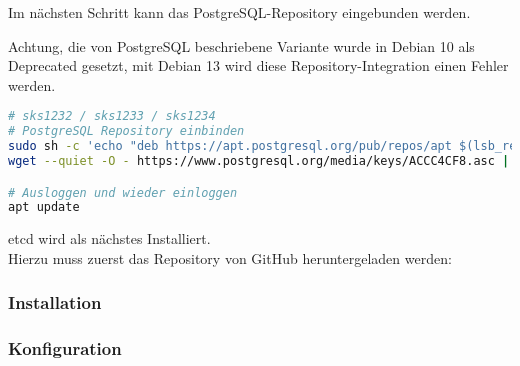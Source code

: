 \begin{flushleft}
    Im nächsten Schritt kann das PostgreSQL-Repository eingebunden werden.\\
    \begin{warning}
    Achtung, die von PostgreSQL beschriebene Variante wurde in Debian 10 als Deprecated gesetzt,
    mit Debian 13 wird diese Repository-Integration einen Fehler werden.
    \end{warning}    \lstset{style=gra_codestyle}
\begin{lstlisting}[language=bash, caption=Patroni - PostgreSQL einbinden,captionpos=b,label={lst:patroni-include-repository},breaklines=true]
# sks1232 / sks1233 / sks1234
# PostgreSQL Repository einbinden
sudo sh -c 'echo "deb https://apt.postgresql.org/pub/repos/apt $(lsb_release -cs)-pgdg main" > /etc/apt/sources.list.d/pgdg.list'
wget --quiet -O - https://www.postgresql.org/media/keys/ACCC4CF8.asc | sudo apt-key add -

# Ausloggen und wieder einloggen
apt update
\end{lstlisting}
\end{flushleft}
\begin{flushleft}
    \gls{etcd} wird als nächstes Installiert.\\
    Hierzu muss zuerst das Repository von \Gls{GitHub} heruntergeladen werden:
\end{flushleft}
\begin{flushleft}
\end{flushleft}
\begin{flushleft}
\end{flushleft}
\begin{flushleft}
\end{flushleft}
\begin{flushleft}
    \subsubsection{Installation}
\end{flushleft}
\begin{flushleft}
\end{flushleft}
\begin{flushleft}
    \subsubsection{Konfiguration}
\end{flushleft}
\begin{flushleft}
\end{flushleft}